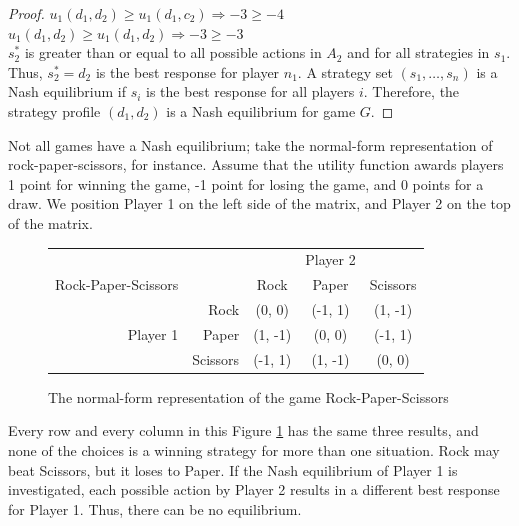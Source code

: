 \begin{proof}
  $u_1(d_1, d_2)\ge u_1(d_1, c_2) \Rightarrow -3\ge -4$\\

  $u_1(d_1, d_2)\ge u_1(d_1, d_2) \Rightarrow -3\ge -3$\\

  $s^*_2$ is greater than or equal to all possible actions in $A_2$ and for all strategies in $s_1$. Thus, $s^*_2=d_2$ is the best response for player $n_1$. A strategy set $(s_1,\dots ,s_n)$ is a Nash equilibrium if $s_i$ is the best response for all players $i$. Therefore, the strategy profile $(d_1, d_2)$ is a Nash equilibrium for game $G$.
\end{proof}

Not all games have a Nash equilibrium; take the normal-form representation of rock-paper-scissors, for instance. Assume that the utility function awards players 1 point for winning the game, -1 point for losing the game, and 0 points for a draw. We position Player 1 on the left side of the matrix, and Player 2 on the top of the matrix.
\begin{figure}[H]
  \centering
  \begin{tabular}{r r | c | c | c |}
    &\multicolumn{1}{c}{}&\multicolumn{1}{c}{}&\multicolumn{1}{c}{Player 2}&\multicolumn{1}{c}{}\\
    Rock-Paper-Scissors &\multicolumn{1}{c}{}&\multicolumn{1}{c}{Rock}&\multicolumn{1}{c}{Paper}&\multicolumn{1}{c}{Scissors} \\ \cline{3-5}
    & Rock & (0, 0) & (-1, 1) & (1, -1) \\ \cline{3-5}
    Player 1 & Paper & (1, -1) & (0, 0) & (-1, 1) \\ \cline{3-5}
    & Scissors & (-1, 1) & (1, -1) & (0, 0) \\ \cline{3-5}
  \end{tabular}
  \caption{The normal-form representation of the game Rock-Paper-Scissors}
  \label{fig:RPS}
\end{figure}

Every row and every column in this Figure \ref{fig:RPS} has the same three results, and none of the choices is a winning strategy for more than one situation. Rock may beat Scissors, but it loses to Paper. If the Nash equilibrium of Player 1 is investigated, each possible action by Player 2 results in a different best response for Player 1. Thus, there can be no equilibrium.

